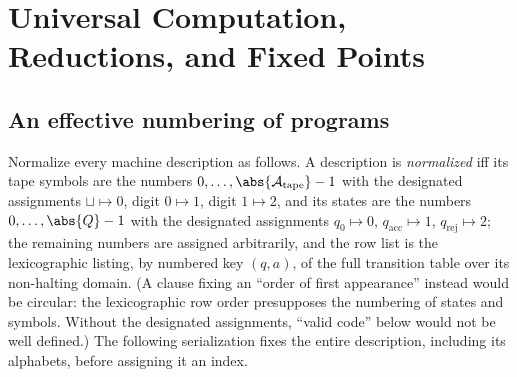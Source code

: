 \chapter{Universal Computation, Reductions, and Fixed Points}
\label{ch:universal-reductions}

\section{An effective numbering of programs}
\label{sec:universal-reductions-01}

Normalize every machine description as follows.  A description is
\emph{normalized} iff its tape symbols are the numbers
\(0,\ldots,\abs{\mathcal A_{\mathrm{tape}}}-1\) with the designated
assignments \(\sqcup\mapsto0\), digit \(0\mapsto1\), digit \(1\mapsto2\),
and its states are the numbers \(0,\ldots,\abs{Q}-1\) with the designated
assignments \(q_0\mapsto0\), \(q_{\mathrm{acc}}\mapsto1\),
\(q_{\mathrm{rej}}\mapsto2\); the remaining numbers are assigned
arbitrarily, and the row list is the lexicographic listing, by numbered key
\((q,a)\), of the full transition table over its non-halting domain.  (A
clause fixing an ``order of first appearance'' instead would be circular:
the lexicographic row order presupposes the numbering of states and
symbols.  Without the designated assignments, ``valid code'' below would
not be well defined.)  The following serialization fixes the entire
description, including its alphabets, before assigning it an index.

